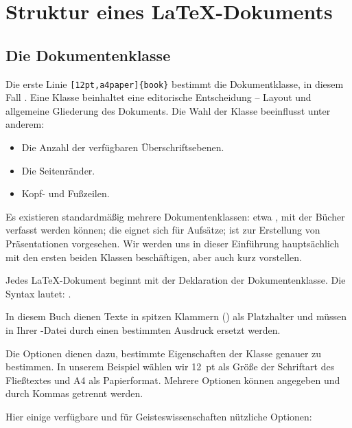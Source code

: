 \section{Struktur eines \LaTeX-Dokuments}

\subsection{Die Dokumentenklasse}
Die erste Linie \verb|[12pt,a4paper]{book}| bestimmt die Dokumentklasse, in diesem Fall . Eine Klasse beinhaltet eine editorische Entscheidung -- Layout und allgemeine Gliederung des Dokuments. Die Wahl der Klasse beeinflusst unter anderem:

\begin{itemize}
\item Die Anzahl der verfügbaren Überschriftsebenen.
\item Die Seitenränder.
\item Kopf- und Fußzeilen.
\end{itemize}

Es existieren standardmäßig mehrere Dokumentenklassen: etwa , mit der Bücher verfasst werden können; die  eignet sich für Aufsätze;  ist zur Erstellung von Präsentationen vorgesehen. Wir werden uns in dieser Einführung hauptsächlich mit den ersten beiden Klassen beschäftigen,  aber auch kurz vorstellen.


Jedes \LaTeX-Dokument beginnt mit der Deklaration der Dokumentenklasse. Die Syntax lautet: .

\begin{attention}
In diesem Buch dienen Texte in spitzen Klammern () als Platzhalter und müssen in Ihrer -Datei durch einen bestimmten Ausdruck ersetzt werden.
\end{attention}

Die Optionen dienen dazu, bestimmte Eigenschaften der Klasse genauer zu bestimmen. In unserem Beispiel wählen wir 12~pt als Größe der Schriftart des Fließtextes und A4 als Papierformat. Mehrere Optionen können angegeben und durch Kommas getrennt werden.\label{optionsclasse}

Hier einige verfügbare und für Geisteswissenschaften nützliche Optionen:

